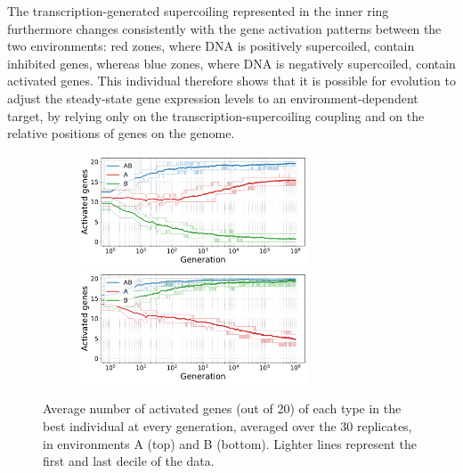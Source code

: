 The transcription-generated supercoiling represented in the inner ring furthermore changes consistently with the gene activation patterns between the two environments: red zones, where DNA is positively supercoiled, contain inhibited genes, whereas blue zones, where DNA is negatively supercoiled, contain activated genes.
This individual therefore shows that it is possible for evolution to adjust the steady-state gene expression levels to an environment-dependent target, by relying only on the transcription-supercoiling coupling and on the relative positions of genes on the genome.

\begin{figure}[H]
  \begin{subfigure}[t]{\textwidth}
    \centering
    \includegraphics[width=0.75\textwidth]{ploscb/img/gene_activity_env_A_quantile.pdf}
    \includegraphics[width=0.75\textwidth]{ploscb/img/gene_activity_env_B_quantile.pdf}
  \end{subfigure}
  \caption{Average number of activated genes (out of 20) of each type in the best individual at every generation, averaged over the 30 replicates, in environments A (top) and B (bottom).
  Lighter lines represent the first and last decile of the data.}
  \label{fig:gene_activity_by_env}
\end{figure}

